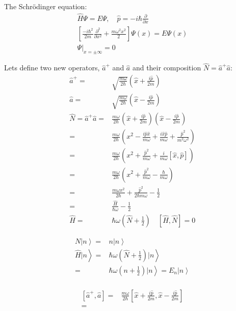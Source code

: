 	The Schr\"odinger equation:
	\begin{align}
		\hat{H}\Psi = E\Psi, \quad \hat{p} = -i\hbar\frac{\partial}{\partial x} \\
		\left[\frac{-i\hbar^2}{2m} \frac{\partial^2}{\partial x^2} + \frac{m\omega^2x^2}{2}\right]\Psi(x) = E\Psi(x) \\
		\Psi|_{x = \pm \infty} = 0
	\end{align}
	
	Lets define two new operators, $\hat{a}^+$ and $\hat{a}$ and their composition $\hat{N} = \hat{a}^+\hat{a}$:
	\begin{align}
		\hat{a}^+ =& \sqrt{\frac{m\omega}{2\hbar}}\left(\hat{x} + \frac{i\hat{p}}{2m}\right) \\
		\hat{a} =& \sqrt{\frac{m\omega}{2\hbar}}\left(\hat{x} - \frac{i\hat{p}}{2m}\right) \\
		\hat{N} = \hat{a}^+\hat{a} =& \frac{m\omega}{2\hbar}\left(\hat{x} + \frac{i\hat{p}}{2m}\right)\left(\hat{x} - \frac{i\hat{p}}{2m}\right)\\
		=& \frac{m\omega}{2\hbar}\left( x^2 - \frac{i\hat{p}\hat{x}}{m\omega} + \frac{i\hat{x}\hat{p}}{m\omega} + \frac{\hat{p}^2}{m^2\omega^2} \right)\\
		=& \frac{m\omega}{2\hbar}\left(x^2 + \frac{\hat{p}^2}{m\omega} + \frac{i}{m\omega}\left[\hat{x}, \hat{p}\right]\right)\\
		=&\frac{m\omega}{2\hbar}\left(x^2 + \frac{\hat{p}^2}{m\omega} - \frac{\hbar}{m\omega}\right)\\
		=& \frac{m\omega x^2}{2\hbar} + \frac{\hat{p}^2}{2\hbar m\omega} - \frac{1}{2}\\
		=& \frac{\hat{H}}{\hbar\omega} - \frac{1}{2}\\
		\hat{H} =& \hbar\omega\left(\hat{N} + \frac{1}{2}\right)\quad \left[\hat{H}, \hat{N}\right] = 0
	\end{align}

	\begin{align}
		\left. N | n \right\rangle =& \left. n |n \right\rangle \\
		\left. \hat{H} | n \right\rangle =& \left. \hbar\omega\left(\hat{N} + \frac{1}{2}\right) | n \right\rangle\\
		 =& \left. \hbar\omega\left(n + \frac{1}{2}\right) | n \right\rangle = \left. E_n | n \right\rangle\\		
	\end{align}

	\begin{align}
		\left[\hat{a}^+, \hat{a}\right] =& \frac{m\omega}{2\hbar}\left[\hat{x} + \frac{i\hat{p}}{2m}, \hat{x} - \frac{i\hat{p}}{2m}\right]\\
		=&
	\end{align}

